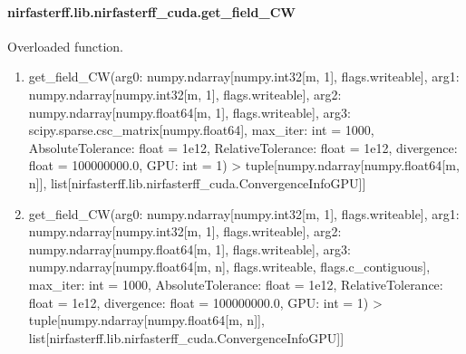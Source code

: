 \documentclass[letterpaper,10pt,english]{sphinxmanual}
\begin{document}
\sphinxstepscope


\paragraph{nirfasterff.lib.nirfasterff\_cuda.get\_field\_CW}
\label{\detokenize{_autosummary/nirfasterff.lib.nirfasterff_cuda.get_field_CW:nirfasterff-lib-nirfasterff-cuda-get-field-cw}}\label{\detokenize{_autosummary/nirfasterff.lib.nirfasterff_cuda.get_field_CW::doc}}

\begin{fulllineitems}
\label{\detokenize{_autosummary/nirfasterff.lib.nirfasterff_cuda.get_field_CW:nirfasterff.lib.nirfasterff_cuda.get_field_CW}}
\pysigstartsignatures
\pysiglinewithargsret
{}
{\sphinxparamcomma {}}
{}
\pysigstopsignatures
\sphinxAtStartPar
Overloaded function.
\begin{enumerate}
%
\item {} 
\sphinxAtStartPar
get\_field\_CW(arg0: numpy.ndarray{[}numpy.int32{[}m, 1{]}, flags.writeable{]}, arg1: numpy.ndarray{[}numpy.int32{[}m, 1{]}, flags.writeable{]}, arg2: numpy.ndarray{[}numpy.float64{[}m, 1{]}, flags.writeable{]}, arg3: scipy.sparse.csc\_matrix{[}numpy.float64{]}, max\_iter: int = 1000, AbsoluteTolerance: float = 1e\sphinxhyphen{}12, RelativeTolerance: float = 1e\sphinxhyphen{}12, divergence: float = 100000000.0, GPU: int = \sphinxhyphen{}1) \sphinxhyphen{}\textgreater{} tuple{[}numpy.ndarray{[}numpy.float64{[}m, n{]}{]}, list{[}nirfasterff.lib.nirfasterff\_cuda.ConvergenceInfoGPU{]}{]}

\item {} 
\sphinxAtStartPar
get\_field\_CW(arg0: numpy.ndarray{[}numpy.int32{[}m, 1{]}, flags.writeable{]}, arg1: numpy.ndarray{[}numpy.int32{[}m, 1{]}, flags.writeable{]}, arg2: numpy.ndarray{[}numpy.float64{[}m, 1{]}, flags.writeable{]}, arg3: numpy.ndarray{[}numpy.float64{[}m, n{]}, flags.writeable, flags.c\_contiguous{]}, max\_iter: int = 1000, AbsoluteTolerance: float = 1e\sphinxhyphen{}12, RelativeTolerance: float = 1e\sphinxhyphen{}12, divergence: float = 100000000.0, GPU: int = \sphinxhyphen{}1) \sphinxhyphen{}\textgreater{} tuple{[}numpy.ndarray{[}numpy.float64{[}m, n{]}{]}, list{[}nirfasterff.lib.nirfasterff\_cuda.ConvergenceInfoGPU{]}{]}

\end{enumerate}

\end{fulllineitems}
\end{document}
